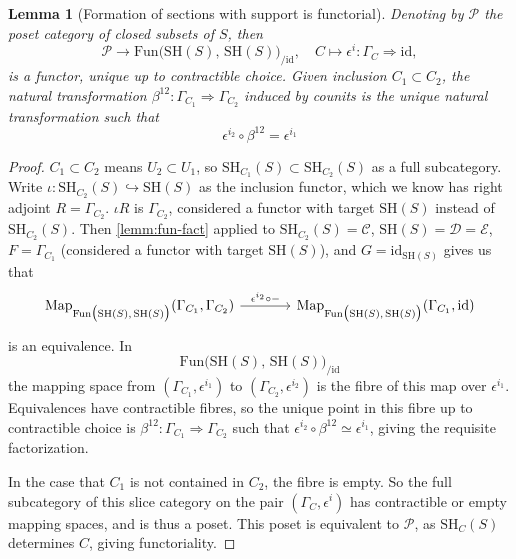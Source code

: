 \documentclass[11pt, twoside]{article}
\numberwithin{equation}{section}
\newtheorem{lemma}[equation]{Lemma}
\theoremstyle{definition}
\newcommand{\id}{\mathrm{id} }
\newcommand{\sh}{\mathrm{SH}}
\newcommand{\fun}{\mathrm{Fun}}
\newcommand{\Map}{\mathrm{Map}}
\begin{document}
\begin{lemma}[Formation of sections with support is functorial]\label{lemm:supp-fun}
Denoting by \(\mathcal{P}\) the poset category of closed subsets of \(S\), then 
\[\mathcal{P} \to \fun\big(\sh(S), \, \sh(S)\big)_{/\id}, \quad C \mapsto \epsilon^i \colon\Gamma_C \Longrightarrow \id,\]
is a functor, unique up to contractible choice. Given inclusion \(C_1 \subset C_2\), the natural transformation \(\beta^{12} \colon \Gamma_{C_1} \Longrightarrow \Gamma_{C_2}\) induced by counits is the unique natural transformation such that
\begin{equation}
\epsilon^{i_2} \circ \beta^{12} = \epsilon^{i_1}
\end{equation}
\end{lemma}

\begin{proof}
\(C_1 \subset C_2\) means \(U_2 \subset U_1\), so \(\sh_{C_1}(S) \subset \sh_{C_2}(S)\) as a full subcategory. Write \(\iota \colon \sh_{C_2}(S) \hookrightarrow \sh(S)\) as the inclusion functor, which we know has right adjoint \(R = \Gamma_{C_2}\). \(\iota R\) is \(\Gamma_{C_2}\), considered a functor with target \(\sh(S)\) instead of \(\sh_{C_2}(S)\). Then \ref{lemm:fun-fact} applied to \(\sh_{C_2}(S) = \mathcal{C}\), \(\sh(S) = \mathcal{D} = \mathcal{E}\), \(F = \Gamma_{C_1}\) (considered a functor with target \(\sh(S)\)), and \(G = \id_{\sh(S)}\) gives us that 
\[\begin{tikzcd} [column sep = large]
\Map_{\fun\big(\sh(S), \, \sh(S)\big)}(\Gamma_{C_1}, \Gamma_{C_2}) \ar[r, "\epsilon^{i_2} \circ -"] & \Map_{\fun\big(\sh(S), \, \sh(S)\big)}(\Gamma_{C_1}, \id)
\end{tikzcd}\]
is an equivalence. In 
\[\fun\big(\sh(S), \, \sh(S)\big)_{/\id}\]
the mapping space from \((\Gamma_{C_1}, \epsilon^{i_1})\) to \((\Gamma_{C_2}, \epsilon^{i_2})\) is the fibre of this map over \(\epsilon^{i_1}\). Equivalences have contractible fibres, so the unique point in this fibre up to contractible choice is \(\beta^{12} \colon \Gamma_{C_1} \Longrightarrow \Gamma_{C_2}\) such that \(\epsilon^{i_2} \circ \beta^{12} \simeq \epsilon^{i_1}\), giving the requisite factorization.

In the case that \(C_1\) is not contained in \(C_2\), the fibre is empty. So the full subcategory of this slice category on the pair \((\Gamma_C, \epsilon^i)\) has contractible or empty mapping spaces, and is thus a poset. This poset is equivalent to \(\mathcal{P}\), as \(\sh_C(S)\) determines \(C\), giving functoriality.
\end{proof}
\end{document}
